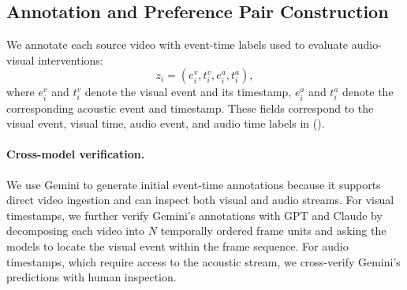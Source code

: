 \documentclass{llmxive}
\providecommand{\shift}{\textbf{\textit{Shift}}\xspace}
\providecommand{\mute}{\textbf{\textit{Mute}}\xspace}
\providecommand{\swap}{\textbf{\textit{Swap}}\xspace}
\begin{document}



\subsection{Annotation and Preference Pair Construction}
\label{sec:AAPC}

We annotate each source video with event-time labels used to evaluate audio-visual interventions:
\begin{equation}
    z_i = (e_i^v, t_i^v, e_i^a, t_i^a),
\end{equation}
where $e_i^v$ and $t_i^v$ denote the visual event and its timestamp, $e_i^a$ and $t_i^a$ denote the corresponding acoustic event and timestamp. These fields correspond to the visual event, visual time, audio event, and audio time labels in  ().

\paragraph{Cross-model verification.}
We use Gemini to generate initial event-time annotations because it supports direct video ingestion and can inspect both visual and audio streams. For visual timestamps, we further verify Gemini's annotations with GPT and Claude by decomposing each video into $N$ temporally ordered frame units and asking the models to locate the visual event within the frame sequence. For audio timestamps, which require access to the acoustic stream, we cross-verify Gemini's predictions with human inspection.
\end{document}
